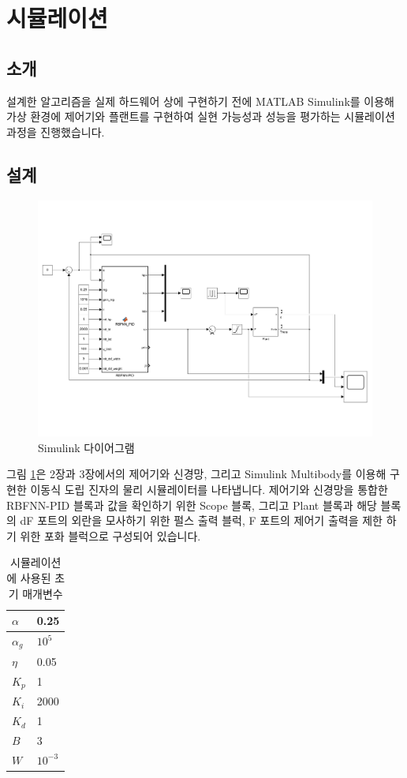 \section{시뮬레이션}
\subsection{소개}
설계한 알고리즘을 실제 하드웨어 상에 구현하기 전에 MATLAB Simulink를 이용해 가상 환경에 제어기와 플랜트를 구현하여 실현 가능성과 성능을 평가하는 시뮬레이션 과정을 진행했습니다.
%
\subsection{설계}
%
\begin{figure}[h]
    \centering
    \includegraphics[width=\textwidth,trim={0 3cm 0 3cm},clip]{figures/upper.pdf}
    \caption{Simulink 다이어그램}
    \label{fig:simulink_diagram}
\end{figure}
%
그림 \ref{fig:simulink_diagram}은 2장과 3장에서의 제어기와 신경망, 그리고 Simulink Multibody를 이용해 구현한 이동식 도립 진자의 물리 시뮬레이터를 나타냅니다. 제어기와 신경망을 통합한 RBFNN-PID 블록과 값을 확인하기 위한 Scope 블록, 그리고 Plant 블록과 해당 블록의 dF 포트의 외란을 모사하기 위한 펄스 출력 블럭, F 포트의 제어기 출력을 제한 하기 위한 포화 블럭으로 구성되어 있습니다.  
%
\begin{table}[h!]
\centering
\begin{tabularx}{5cm}{|C|C|}
 \hline
 $\alpha$ & 0.25 \\ 
 \hline
 $\alpha_{g}$ & $10^5$ \\
 \hline
 $\eta$ & 0.05 \\ 
 \hline
 $K_{p}$ & 1 \\ 
 \hline
 $K_{i}$ & 2000 \\ 
 \hline
 $K_{d}$ & 1 \\
 \hline
 $B$ & 3 \\
 \hline
 $W$ & $10^{-3}$ \\
 \hline
\end{tabularx}
\caption{시뮬레이션에 사용된 초기 매개변수}
\end{table}

